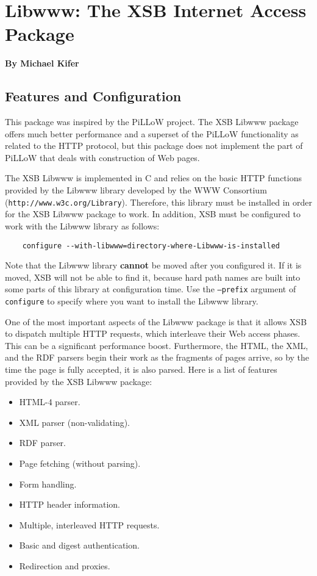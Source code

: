 \chapter{Libwww: The XSB Internet Access Package}
\label{chap-libwww}

\begin{center}
{\Large {\bf By Michael Kifer}}
\end{center}


\section{Features and Configuration}
This package was inspired by the PiLLoW project.
The XSB Libwww package offers much better performance and a superset of the
PiLLoW functionality as related to the HTTP protocol, but this package does
not implement the part of PiLLoW that deals with construction of Web pages.

The XSB Libwww is implemented in C and relies on the basic HTTP functions
provided by the Libwww library developed by the WWW Consortium
(\verb|http://www.w3c.org/Library|). Therefore, this library must be
installed in order for the XSB Libwww package to work. In addition, XSB
must be configured to work with the Libwww library as follows:
\begin{verbatim}
    configure --with-libwww=directory-where-Libwww-is-installed  
\end{verbatim}
Note that the Libwww library {\bf cannot} be moved after you configured it.
If it is moved, XSB will not be able to find it, because hard path names
are built into some parts of this library at configuration time. Use the
{\tt --prefix} argument of {\tt configure} to specify where you want to
install the Libwww library.

One of the most important aspects of the Libwww package is that it allows
XSB to dispatch multiple HTTP requests, which interleave their Web access
phases. This can be a significant performance boost. Furthermore, the HTML,
the XML, and the RDF parsers begin their work as the fragments of pages
arrive, so by the time the page is fully accepted, it is also parsed. Here
is a list of features provided by the XSB Libwww package:
\begin{itemize}
  \item  HTML-4 parser.
  \item  XML parser (non-validating).
  \item  RDF parser.
  \item  Page fetching (without parsing).
  \item  Form handling.
  \item  HTTP header information.
  \item  Multiple, interleaved HTTP requests.
  \item  Basic and digest authentication.
  \item  Redirection and proxies.
\end{itemize}


